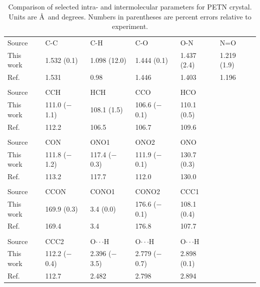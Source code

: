 \documentclass[prb,aps,nobibnotes,twocolumn,doublespace,twocolumngrid,superbib]{revtex4}
\begin{document}
\begin{table}[p]
\begin{center}
\begin{tabular}{llllll}
\hline\hline
Source & C-C & C-H & C-O & O-N & N=O  \\
This work & 1.532 (0.1) & 1.098 (12.0) & 1.444 (0.1) &  1.437 (2.4) & 1.219 (1.9) \\
Ref.~\cite{Conant_1979} &  1.531   &   0.98  & 1.446  &  1.403 &   1.196 \\
\hline
\\
Source  &  CCH   &        HCH     &      CCO    &       HCO \\
This work & 111.0 ($-$1.1)  & 108.1  (1.5) &  106.6 ($-$0.1) & 110.1 (0.5) \\
Ref.~\cite{Conant_1979} &  112.2    &  106.5  &  106.7   & 109.6 \\
\hline
\\
Source   &  CON     &       ONO1   &        ONO2     &      ONO \\
This work&  111.8 ($-$1.2) &  117.4 ($-$0.3)&  111.9 ($-$0.1)&  130.7 (0.3)\\
Ref.~\cite{Conant_1979} &    113.2   &       117.7   &       112.0   &       130.0\\
\hline\\
Source &    CCON    &       CONO1   &       CONO2    &   CCC1\\
This work &  169.9 (0.3) &   3.4 (0.0) &     176.6 ($-$0.1) & 108.1 (0.4)\\
Ref.~\cite{Conant_1979} &   169.4   &       3.4     &       176.8        & 107.7\\
\hline\\
Source &  CCC2 &  O$\cdot\cdot\cdot$H   &       O$\cdot\cdot\cdot$H   &       O$\cdot\cdot\cdot$H\\
This work &  112.2 ($-$0.4) & 2.396 ($-$3.5) &   2.779 ($-$0.7) & 2.898 (0.1)\\
Ref.~\cite{Conant_1979} &   112.7 & 2.482   &       2.798   &       2.894\\
\hline\hline
\end{tabular}
\end{center}
\caption{Comparison of selected intra- and intermolecular parameters for
PETN crystal.  Units are \AA\ and degrees.  Numbers in parentheses
are percent errors relative to experiment.
}
\label{tab:table2}
\end{table}
\end{document}
